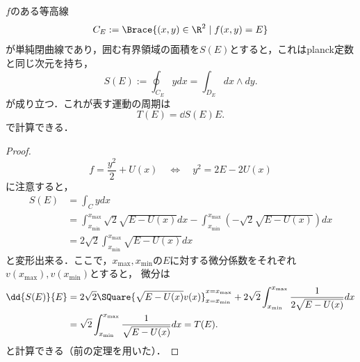 \documentclass[uplatex,dvipdfmx]{jsarticle}
\begin{document}
\begin{exercise}[閉軌道の周期の特徴付け]
    $f$のある等高線
    \[C_E:=\Brace{(x,y)\in\R^2\mid f(x,y)=E}\]
    が単純閉曲線であり，囲む有界領域の面積を$S(E)$とすると，これはplanck定数と同じ次元を持ち，
    \[S(E):=\oint_{C_E}ydx=\int_{D_E}dx\wedge dy.\]
    が成り立つ．これが表す運動の周期は
    \[T(E)=\dd{S(E)}{E}.\]
    で計算できる．
\end{exercise}
\begin{proof}
    \[f=\frac{y^2}{2}+U(x)\quad\Leftrightarrow\quad y^2=2E-2U(x)\]
    に注意すると，
    \begin{align*}
        S(E)&=\int_Cydx\\
        &=\int^{x_{\mathrm{max}}}_{x_{\mathrm{min}}}\sqrt{2}\sqrt{E-U(x)}dx-\int^{x_{\mathrm{max}}}_{x_{\mathrm{min}}}(-\sqrt{2}\sqrt{E-U(x)})dx\\
        &=2\sqrt{2}\int^{x_{\mathrm{max}}}_{x_{\mathrm{min}}}\sqrt{E-U(x)}dx
    \end{align*}
    と変形出来る．ここで，$x_{\mathrm{max}},x_{\mathrm{min}}$の$E$に対する微分係数をそれぞれ$v(x_{\mathrm{max}}),v(x_{\mathrm{min}})$とすると，
    微分は
    \begin{align*}
        \dd{S(E)}{E}&=2\sqrt{2}\SQuare{\sqrt{E-U(x)}v(x)}^{x=x_{\mathrm{max}}}_{x=x_{\mathrm{min}}}+2\sqrt{2}\int^{x_{\mathrm{max}}}_{x_{\mathrm{min}}}\frac{1}{2\sqrt{E-U(x)}}dx\\
        &=\sqrt{2}\int^{x_{\mathrm{max}}}_{x_{\mathrm{min}}}\frac{1}{\sqrt{E-U(x)}}dx=T(E).
    \end{align*}
    と計算できる（前の定理を用いた）．
\end{proof}
\end{document}
